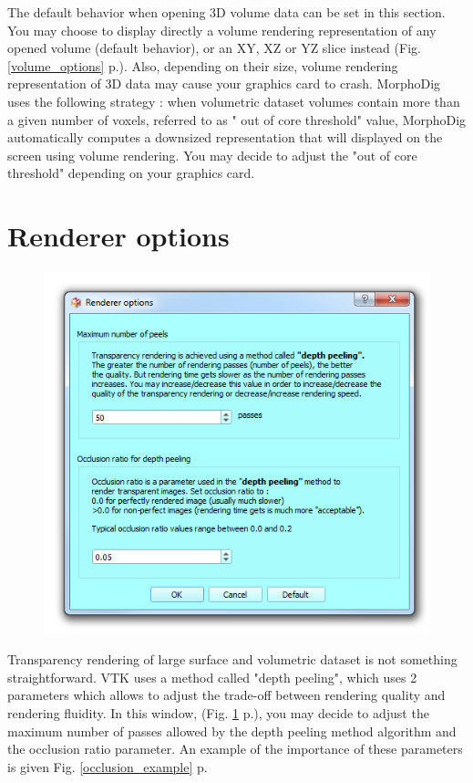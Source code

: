 The default behavior when opening 3D volume data can be set in this section. You may choose to display directly a volume rendering representation of any opened volume (default behavior), or an XY, XZ or YZ slice instead (Fig. \ref{volume_options} p.\pageref{volume_options}). Also, depending on their size, volume rendering representation of 3D data may cause your graphics card to crash. MorphoDig uses the following strategy : when volumetric dataset volumes contain more than a given number of voxels, referred to as " out of core threshold" value, MorphoDig automatically computes a downsized representation that will displayed on the screen using volume rendering. You may decide to adjust the "out of core threshold" depending on your graphics card. 

\section{Renderer options}
\begin{figure}
  \centering  
 \includegraphics[scale=0.5]{images/08/renderer_options.png}
\label{renderer_options}
\end{figure}

Transparency rendering of large surface and volumetric dataset is not something straightforward. VTK uses a method called "depth peeling", which uses 2 parameters which allows to adjust the trade-off between rendering quality and rendering fluidity. 
In this window, (Fig. \ref{renderer_options} p.\pageref{renderer_options}), you may decide to adjust the maximum number of passes allowed by the depth peeling method algorithm and the occlusion ratio parameter. An example of the importance of these parameters is given Fig. \ref{occlusion_example} p.\pageref{occlusion_example}


